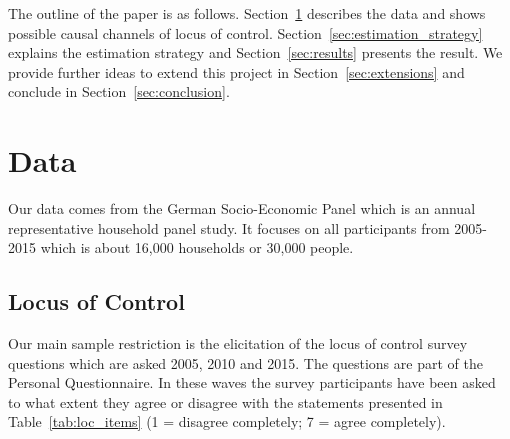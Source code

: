 \documentclass[12pt, a4paper, fleqn, parskip]{scrartcl}
\begin{document}
The outline of the paper is as follows. Section~\ref{sec:data} describes the data and
shows possible causal channels of locus of control.
Section~\ref{sec:estimation_strategy} explains the estimation strategy and
Section~\ref{sec:results} presents the result. We provide further ideas to extend this
project in Section~\ref{sec:extensions} and conclude in Section~\ref{sec:conclusion}.

\section{Data}
\label{sec:data}

Our data comes from the German Socio-Economic Panel \citep{gsoep2017} which is an annual
representative household panel study. It focuses on all participants from 2005-2015
which is about 16,000 households or 30,000 people.

\subsection{Locus of Control} %
\label{sub:locus_of_control}

Our main sample restriction is the elicitation of the locus of control survey questions
which are asked 2005, 2010 and 2015. The questions are part of the Personal
Questionnaire. In these waves the survey participants have been asked to what extent
they agree or disagree with the statements presented in Table~\ref{tab:loc_items} (1 =
disagree completely; 7 = agree completely).
\end{document}
